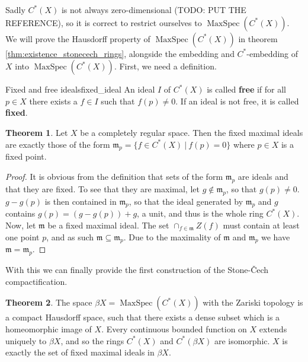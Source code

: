 \documentclass[a4paper]{book}
\theoremstyle{definition}
\newtheorem{theorem}{Theorem}[section]
\theoremstyle{ejemplo}
\theoremstyle{demostracion}
\DeclareMathOperator{\maxspec}{MaxSpec}
\begin{document}
Sadly $C^*(X)$ is not always zero-dimensional (TODO: PUT THE REFERENCE), so it is correct to restrict ourselves to $\maxspec(C^*(X))$.\\ 
We will prove the Hausdorff property of $\maxspec(C^*(X))$ in theorem \eqref{thm:existence_stonecech_rings}, alongside the embedding and $C^*$-embedding of $X$ into $\maxspec(C^*(X))$. First, we need a definition.

\begin{define}{Fixed and free ideals}{fixed_ideal}
	An ideal $I$ of $C^*(X)$ is called \textbf{free} if for all $p \in X$ there exists a $f \in I$ such that $f(p) \neq 0$. If an ideal is not free, it is called \textbf{fixed}.
\end{define}

\begin{theorem}
	Let $X$ be a completely regular space. Then the fixed maximal ideals are exactly those of the form $\mathfrak{m}_p = \{f \in C^*(X)\ |\ f(p) = 0 \}$ where $p \in X$ is a fixed point.
\end{theorem}
\begin{proof}
	It is obvious from the definition that sets of the form $\mathfrak{m}_p$ are ideals and that they are fixed. To see that they are maximal, let $g \not \in \mathfrak{m}_p$, so that $g(p) \neq 0$. $g - g(p)$ is then contained in $\mathfrak{m}_p$, so that the ideal generated by $\mathfrak{m}_p$ and $g$ contains $g(p) = (g - g(p)) + g$, a unit, and thus is the whole ring $C^*(X)$.\\ 
	Now, let $\mathfrak{m}$ be a fixed maximal ideal. The set $\cap_{f \in \mathfrak{m}} Z(f)$ must contain at least one point $p$, and as such $\mathfrak{m} \subseteq \mathfrak{m}_p$. Due to the maximality of $\mathfrak{m}$ and $\mathfrak{m}_p$ we have $\mathfrak{m} = \mathfrak{m}_p$.
\end{proof}

With this we can finally provide the first construction of the Stone-Čech compactification.

\begin{theorem}\label{thm:existence_stonecech_rings}
	The space $\beta X = \maxspec(C^*(X))$ with the Zariski topology is a compact Hausdorff space, such that there exists a dense subset which is a homeomorphic image of $X$. Every continuous bounded function on $X$ extends uniquely to $\beta X$, and so the rings $C^*(X)$ and $C^*(\beta X)$ are isomorphic. $X$ is exactly the set of fixed maximal ideals in $\beta X$.
\end{theorem}
\end{document}
